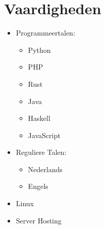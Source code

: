 \documentclass[a4paper,12pt]{article}
\begin{document}
\section{Vaardigheden}
\begin{itemize}
    \item Programmeertalen:
        \begin{itemize}
            \item Python
            \item PHP
            \item Rust
            \item Java
            \item Haskell
            \item JavaScript
        \end{itemize}
    \item Reguliere Talen:
        \begin{itemize}
            \item Nederlands
            \item Engels
        \end{itemize}
    \item Linux
    \item Server Hosting
\end{itemize}

\vfill
{}
\end{document}
